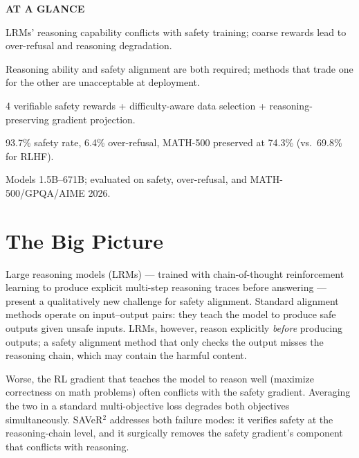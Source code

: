 \documentclass[10pt,twocolumn]{article}
\begin{document}
\begin{mdframed}[backgroundcolor=boxgray,linecolor=rulered,linewidth=1pt,
    innerleftmargin=6pt,innerrightmargin=6pt,
    innertopmargin=6pt,innerbottommargin=6pt]
\textbf{\small AT A GLANCE}\par\vspace{4pt}
\begin{description}[leftmargin=0pt,labelsep=4pt,itemsep=2pt,parsep=0pt,
    font=\small\bfseries]
  \item[Problem:] LRMs' reasoning capability conflicts with safety training; coarse rewards lead to over-refusal and reasoning degradation.
  \item[Why it matters:] Reasoning ability and safety alignment are both required; methods that trade one for the other are unacceptable at deployment.
  \item[Method:] 4 verifiable safety rewards + difficulty-aware data selection + reasoning-preserving gradient projection.
  \item[Result:] 93.7\% safety rate, 6.4\% over-refusal, MATH-500 preserved at 74.3\% (vs.\ 69.8\% for RLHF).
  \item[Evidence:] Models 1.5B--671B; evaluated on safety, over-refusal, and MATH-500/GPQA/AIME 2026.
\end{description}
\end{mdframed}

\section{The Big Picture}

Large reasoning models (LRMs) --- trained with chain-of-thought reinforcement learning to produce explicit multi-step reasoning traces before answering --- present a qualitatively new challenge for safety alignment.
Standard alignment methods operate on input--output pairs: they teach the model to produce safe outputs given unsafe inputs.
LRMs, however, reason explicitly \emph{before} producing outputs; a safety alignment method that only checks the output misses the reasoning chain, which may contain the harmful content.

Worse, the RL gradient that teaches the model to reason well (maximize correctness on math problems) often conflicts with the safety gradient.
Averaging the two in a standard multi-objective loss degrades both objectives simultaneously.
SAVeR$^2$ addresses both failure modes: it verifies safety at the reasoning-chain level, and it surgically removes the safety gradient's component that conflicts with reasoning.
\end{document}
